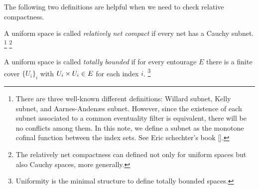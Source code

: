 \documentclass{../exp}
\begin{document}
The following two definitions are helpful when we need to check relative compactness.
\begin{defn}
A uniform space is called \emph{relatively net compact} if every net has a Cauchy subnet.
\footnote{There are three well-known different definitions: Willard subnet, Kelly subnet, and Aarnes-Anden{\ae}s subnet. However, since the existence of each subnet associated to a common eventuality filter is equivalent, there will be no conflicts among them. In this note, we define a subnet as the monotone cofinal function between the index sets. See Eric schechter's book [].}
\footnote{The relatively net compactness can defined not only for uniform spaces but also Cauchy spaces, more generally.}
\end{defn}
\begin{defn}
A uniform space is called \emph{totally bounded} if for every entourage $E$ there is a finite cover $\{U_i\}_i$ with $U_i\times U_i\in E$ for each index $i$.
\footnote{Uniformity is the minimal structure to define totally bounded spaces.}
\end{defn}
\end{document}
